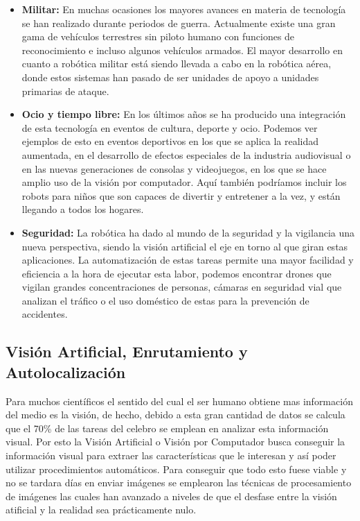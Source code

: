 \begin{itemize}
		\item \textbf{Militar: }En muchas ocasiones los mayores avances en materia de tecnología se han realizado durante periodos de guerra. Actualmente existe una gran gama de vehículos terrestres sin piloto humano con funciones de reconocimiento e incluso algunos vehículos armados. El mayor desarrollo en cuanto a robótica militar está siendo llevada a cabo en la robótica aérea, donde estos sistemas han pasado de ser unidades de apoyo a unidades primarias de ataque.
		\item \textbf{Ocio y tiempo libre: }En los últimos años se ha producido una integración de esta tecnología en eventos de cultura, deporte y ocio. Podemos ver ejemplos de esto en eventos deportivos en los que se aplica la realidad aumentada, en el desarrollo de efectos especiales de la industria audiovisual o en las nuevas generaciones de consolas y videojuegos, en los que se hace amplio uso de la visión por computador. Aquí también podríamos incluir los robots para niños que son capaces de divertir y entretener a la vez, y están llegando a todos los hogares.
		\item \textbf{Seguridad: }La robótica ha dado al mundo de la seguridad y la vigilancia una nueva perspectiva, siendo la visión artificial el eje en torno al que giran estas aplicaciones. La automatización de estas tareas permite una mayor facilidad y eficiencia a la hora de ejecutar esta labor, podemos encontrar drones que vigilan grandes concentraciones de personas, cámaras en seguridad vial que analizan el tráfico o el uso doméstico de estas para la prevención de accidentes.
\end{itemize}

\subsection{Visión Artificial, Enrutamiento y Autolocalización}
\hspace{1cm} Para muchos científicos el sentido del cual el ser humano obtiene mas información del medio es la visión, de hecho, debido a esta gran cantidad de datos se calcula que el 70\% de las tareas del celebro se emplean en analizar esta información visual. Por esto la Visión Artificial o Visión por Computador busca conseguir la información visual para extraer las características que le interesan y así poder utilizar procedimientos automáticos. Para conseguir que todo esto fuese viable y no se tardara días en enviar imágenes se emplearon las técnicas de procesamiento de imágenes las cuales han avanzado a niveles de que el desfase entre la visión atificial y la realidad sea prácticamente nulo.


